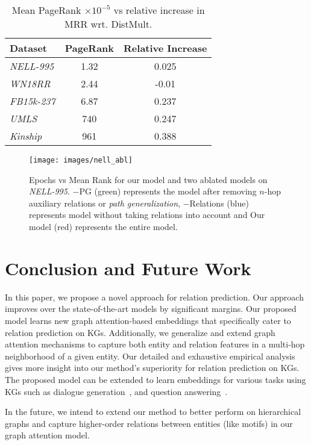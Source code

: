 \documentclass[11pt,a4paper]{article}
\begin{document}
\begin{table}[t!]
\centering
\begin{tabular}{l|cc}
\textbf{Dataset}   &  \textbf{PageRank}  & \textbf{Relative Increase} \\ 
\hline
\emph{NELL-995}  & 1.32 & 0.025  \\
\emph{WN18RR}    & 2.44 & -0.01   \\ 
\emph{FB15k-237} & 6.87 & 0.237  \\ 
\emph{UMLS}      & 740    & 0.247   \\
\emph{Kinship}   & 961    & 0.388   \\
\hline
\end{tabular}
\caption{Mean PageRank \(\times 10^{-5}\) vs relative increase in MRR wrt. DistMult. 
  }\label{tb:ablation}
\end{table}

\begin{figure}[h]
\centering
  \texttt{[image: images/nell\_abl]}
  \caption{Epochs vs Mean Rank for our model and two ablated models on \emph{NELL-995}. \(-\)PG (green) represents the model after removing \(n\)-hop auxiliary relations or \emph{path generalization}, \(-\)Relations (blue) represents model without taking relations into account and Our model (red) represents the entire model.}
  \label{fig:abl}
\end{figure}
\section{Conclusion and Future Work}\label{conclusion}
\label{ssec:conclusion}
In this paper, we propose a novel approach for relation prediction. Our approach improves over the state-of-the-art models by significant margins. 
Our proposed model learns new graph attention-based embeddings that specifically cater to relation prediction on KGs. Additionally, we generalize and extend graph attention mechanisms to capture both entity and relation features in a multi-hop neighborhood of a given entity. Our detailed and exhaustive empirical analysis gives more insight into our method's superiority for relation prediction on KGs. The proposed model can be extended to learn embeddings for various tasks using KGs such as dialogue generation~\cite{Hehe2017, keizer2017}, and question answering~\cite{zhang2016question,diefenbach2018wdaqua}.


In the future, we intend to extend our method to better perform on hierarchical graphs and capture higher-order relations between entities (like motifs) in our graph attention model.
\end{document}

